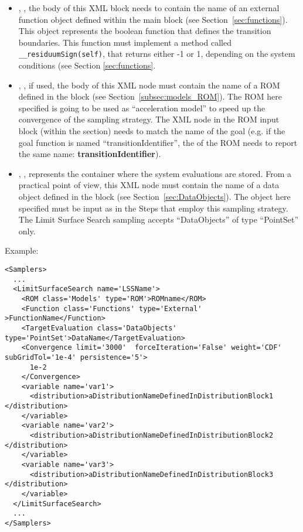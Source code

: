 \begin{itemize}
    \begin{itemize}
      \item {}, ,  the
        body of this XML block needs to contain the name of an external
        function object defined within the  main block (see
        Section~\ref{sec:functions}).
        This object represents the boolean function that defines the transition
        boundaries.
        This function must implement a method called
        \texttt{\_\_residuumSign(self)}, that returns either -1 or 1, depending
        on the system conditions (see Section \ref{sec:functions}.
      \item {}, , if used, the
        body of this XML node must contain the name of a ROM defined in the
         block (see Section~\ref{subsec:models_ROM}). The ROM
        here specified is going to be used as ``acceleration model'' to speed up the
        convergence of the sampling strategy. The  XML node in the ROM
        input block (within the  section) needs to match the name of the goal
         (e.g. if the goal function is named ``transitionIdentifier'', the  of the
        ROM needs to report the same name: \textbf{transitionIdentifier}).
      \item {}, ,
        represents the container where the system evaluations are stored.
        From a practical point of view, this XML node must contain the name of
        a data object defined in the  block (see
        Section~\ref{sec:DataObjects}). The object here specified must be
        input as   in the Steps that employ this sampling strategy.
        The Limit Surface Search sampling accepts ``DataObjects'' of type
        ``PointSet'' only.
    \end{itemize}
\end{itemize}

Example:
\begin{lstlisting}[style=XML,morekeywords={class,limit,subGridTol,weight,persistence}]
<Samplers>
  ...
  <LimitSurfaceSearch name='LSSName'>
    <ROM class='Models' type='ROM'>ROMname</ROM>
    <Function class='Functions' type='External' >FunctionName</Function>
    <TargetEvaluation class='DataObjects' type='PointSet'>DataName</TargetEvaluation>
    <Convergence limit='3000'  forceIteration='False' weight='CDF'  subGridTol='1e-4' persistence='5'>
      1e-2
    </Convergence>
    <variable name='var1'>
      <distribution>aDistributionNameDefinedInDistributionBlock1 </distribution>
    </variable>
    <variable name='var2'>
      <distribution>aDistributionNameDefinedInDistributionBlock2 </distribution>
    </variable>
    <variable name='var3'>
      <distribution>aDistributionNameDefinedInDistributionBlock3 </distribution>
    </variable>
  </LimitSurfaceSearch>
  ...
</Samplers>
\end{lstlisting}

